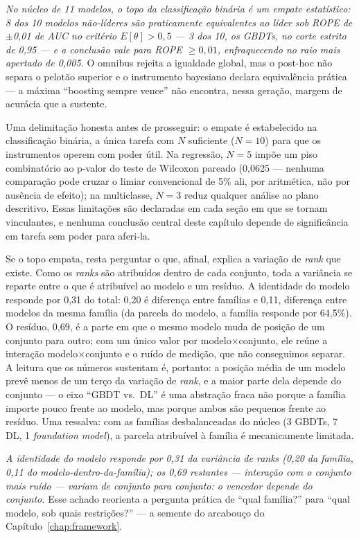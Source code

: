 \emph{No núcleo de 11 modelos, o topo da classificação binária é um
empate estatístico: 8 dos 10 modelos não-líderes são praticamente
equivalentes ao líder sob ROPE de $\pm$0,01 de AUC no critério
$E[\theta]>0{,}5$ --- 3 dos 10, os GBDTs, no corte estrito de 0,95
--- e a conclusão
vale para ROPE $\geq 0{,}01$, enfraquecendo no raio mais apertado
de 0,005.} O omnibus rejeita a igualdade global, mas o post-hoc não separa o
pelotão superior e o instrumento bayesiano declara equivalência prática
--- a máxima ``boosting sempre vence'' não encontra, nessa geração,
margem de acurácia que a sustente.

Uma delimitação honesta antes de prosseguir: o empate é estabelecido na
classificação binária, a única tarefa com $N$ suficiente ($N{=}10$) para
que os instrumentos operem com poder útil. Na regressão, $N{=}5$ impõe
um piso combinatório ao p-valor do teste de Wilcoxon pareado (0,0625 ---
nenhuma comparação pode cruzar o limiar convencional de 5\% ali, por
aritmética, não por ausência de efeito); na multiclasse, $N{=}3$ reduz
qualquer análise ao plano descritivo. Essas limitações são declaradas em
cada seção em que se tornam vinculantes, e nenhuma conclusão central deste
capítulo depende de significância em tarefa sem poder para aferi-la.

Se o topo empata, resta perguntar o que, afinal, explica a variação
de \emph{rank} que existe. Como os \emph{ranks} são atribuídos
dentro de cada conjunto, toda a variância se reparte entre o que é
atribuível ao modelo e um resíduo. A identidade do modelo responde por
0,31 do total: 0,20 é diferença entre famílias e 0,11, diferença entre
modelos da mesma família (da parcela do modelo, a família responde por
64,5\%). O resíduo, 0,69, é a parte em que o mesmo modelo muda de
posição de um conjunto para outro; com um único valor por
modelo$\times$conjunto, ele reúne a interação modelo$\times$conjunto
e o ruído de medição, que não conseguimos separar. A leitura que os
números sustentam é, portanto: a posição média de um modelo prevê
menos de um terço da variação de \emph{rank}, e a maior parte dela
depende do conjunto --- o eixo ``GBDT vs.\ DL'' é uma abstração fraca
não porque a família importe pouco frente ao modelo, mas porque ambos
são pequenos frente ao resíduo. Uma ressalva: com as famílias
desbalanceadas do núcleo (3 GBDTs, 7 DL, 1 \emph{foundation model}),
a parcela atribuível à família é mecanicamente limitada.

\emph{A identidade do modelo responde por 0,31 da variância de ranks
(0,20 da família, 0,11 do modelo-dentro-da-família); os 0,69 restantes
--- interação com o conjunto mais ruído --- variam de conjunto para
conjunto: o vencedor depende do conjunto.} Esse achado reorienta a pergunta prática de ``qual família?'' para ``qual
modelo, sob quais restrições?'' --- a semente do arcabouço do
Capítulo~\ref{chap:framework}.

